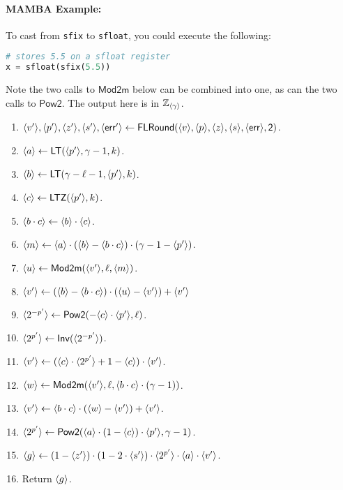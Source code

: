 \paragraph{MAMBA Example:} To cast from \verb|sfix| to \verb|sfloat|, you could execute the following: 
\begin{lstlisting}[language={python}]
# stores 5.5 on a sfloat register
x = sfloat(sfix(5.5))
\end{lstlisting}

\iffalse
Note the two calls to $\mathsf{Mod2m}$ below can be combined into
one, as can the two calls to $\mathsf{Pow2}$.
The output here is in ${\mathbb{Z}}_{\langle \gamma \rangle}$.
\begin{enumerate}
\item $\langle v' \rangle,\langle p' \rangle,\langle z' \rangle,\langle s' \rangle,\langle \mathsf{err}' \rangle
	\leftarrow \mathsf{FLRound}(\langle v \rangle,\langle p \rangle,\langle z \rangle,\langle s \rangle,\langle \mathsf{err} \rangle,\mathsf{2})$. 
\item $\langle a \rangle \leftarrow \mathsf{LT}(\langle p' \rangle,\gamma-1,k)$.
\item $\langle b \rangle \leftarrow \mathsf{LT}(\gamma-\ell-1,\langle p' \rangle,k)$.
\item $\langle c \rangle \leftarrow \mathsf{LTZ}(\langle p' \rangle,k)$.
\item $\langle b \cdot c \rangle \leftarrow \langle b \rangle \cdot \langle c \rangle$.
\item $\langle m \rangle \leftarrow \langle a \rangle\cdot (\langle b \rangle -\langle b \cdot c \rangle)
		\cdot (\gamma-1-\langle p' \rangle)$.
\item $\langle u \rangle \leftarrow \mathsf{Mod2m}(\langle v' \rangle,\ell,\langle m \rangle)$.
\item $\langle v' \rangle \leftarrow (\langle b \rangle -\langle b \cdot c \rangle) \cdot ( \langle u \rangle-\langle v' \rangle) +\langle v' \rangle$
\item $\langle 2^{-p'} \rangle \leftarrow \mathsf{Pow2}(-\langle c \rangle \cdot \langle p' \rangle,\ell)$.
\item $\langle 2^{p'} \rangle \leftarrow \mathsf{Inv}(\langle 2^{-p'} \rangle)$.
\item $\langle v' \rangle \leftarrow (\langle c \rangle \cdot \langle 2^{p'} \rangle+1-\langle c \rangle)
			\cdot \langle v' \rangle$.
\item $\langle w \rangle \leftarrow \mathsf{Mod2m}(\langle v' \rangle,\ell,
		\langle b \cdot c \rangle\cdot(\gamma-1))$.
\item $\langle v' \rangle \leftarrow \langle b \cdot c \rangle \cdot (\langle w \rangle-\langle v' \rangle) +\langle v' \rangle$.
\item $\langle 2^{p'} \rangle \leftarrow \mathsf{Pow2}(\langle a \rangle \cdot (1-\langle c \rangle)
				\cdot \langle p' \rangle,\gamma-1)$.
\item $\langle g \rangle \leftarrow (1-\langle z' \rangle) \cdot (1-2 \cdot \langle s' \rangle)
			\cdot \langle 2^{p'} \rangle \cdot \langle a \rangle
			\cdot \langle v' \rangle$.
\item Return $\langle g \rangle$.
\end{enumerate}
